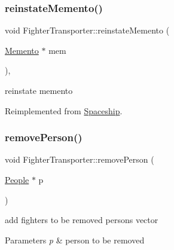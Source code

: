 \mbox{\label{classFighterTransporter_acad1a7b3d68741c58b632ff49b043414}} 
\subsubsection{\texorpdfstring{reinstate\+Memento()}{reinstateMemento()}}
{\footnotesize\ttfamily void Fighter\+Transporter\+::reinstate\+Memento (\begin{DoxyParamCaption}\item[{\hyperlink{classMemento}{Memento} $\ast$}]{mem }\end{DoxyParamCaption})\hspace{0.3cm}{\ttfamily [inline]}, {\ttfamily [virtual]}}

reinstate memento 

Reimplemented from \hyperlink{classSpaceship_ab075c869473344b6471c8e28ca7ea61e}{Spaceship}.

\mbox{\label{classFighterTransporter_a24a22da402edf3ad275ba52b7cbbf738}} 
\subsubsection{\texorpdfstring{remove\+Person()}{removePerson()}}
{\footnotesize\ttfamily void Fighter\+Transporter\+::remove\+Person (\begin{DoxyParamCaption}\item[{\hyperlink{classPeople}{People} $\ast$}]{p }\end{DoxyParamCaption})}

add fighters to be removed persons vector 
\begin{DoxyParams}{Parameters}
{\em p} & person to be removed \\
\hline
\end{DoxyParams}
\mbox{\label{classFighterTransporter_af7050ee155b38c4ae45d38d66bc5fc2f}} 
